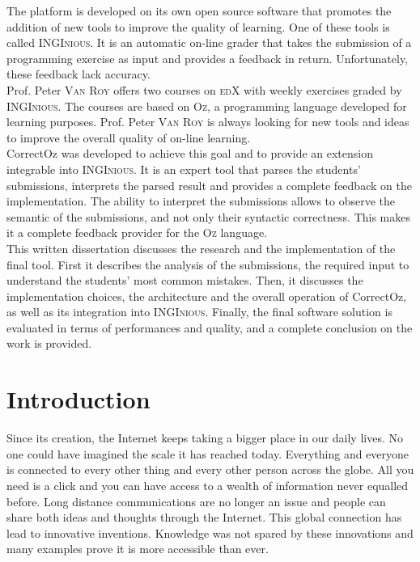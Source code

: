 \documentclass[11pt,a4paper,twoside,openright]{report}
\begin{document}
The platform is developed on its own open source software that promotes the 
addition of new tools to improve the quality of learning. One of these tools is 
called \textsc{INGInious}. It is an automatic on-line grader that takes the 
submission of a programming exercise as input and provides a feedback in return. 
Unfortunately, these feedback lack accuracy.\\

Prof. Peter \textsc{Van Roy} offers two courses on \textsc{edX} with weekly 
exercises graded by \textsc{INGInious}. The courses are based on \textsc{Oz}, a 
programming language developed for learning purposes. Prof. Peter \textsc{Van 
Roy} is always looking for new tools and ideas to improve the overall quality 
of on-line learning.\\

CorrectOz was developed to achieve this goal and to provide 
an extension integrable into \textsc{INGInious}. It is an expert tool that 
parses the students' submissions, interprets the parsed result and provides a 
complete feedback on the implementation. The ability to interpret the 
submissions allows to observe the semantic of the submissions, and not only 
their syntactic correctness. This makes it a complete feedback provider for the 
\textsc{Oz} language.\\

This written dissertation discusses the research and the implementation of the 
final tool. First it describes the analysis of the submissions, the required input 
to understand the students' most common mistakes. Then, it discusses the 
implementation choices, the architecture and the overall operation of CorrectOz, 
as well as its integration into \textsc{INGInious}. Finally, the final software 
solution is evaluated in terms of performances and quality, and a complete 
conclusion on the work is provided.

\cleardoublepage
\tableofcontents

\cleardoublepage
\chapter{Introduction}
Since its creation, the Internet keeps taking a bigger place in our daily lives. 
No one could have imagined the scale it has reached today. Everything and 
everyone is connected to every other thing and every other person across the 
globe. All you need is a click and you can have access to a wealth of 
information never equalled before. Long distance communications are no longer 
an issue and people can share both ideas and thoughts through the Internet. 
This global connection has lead to innovative inventions. Knowledge was not 
spared by these innovations and many examples prove it is more accessible than 
ever.\\
\end{document}

